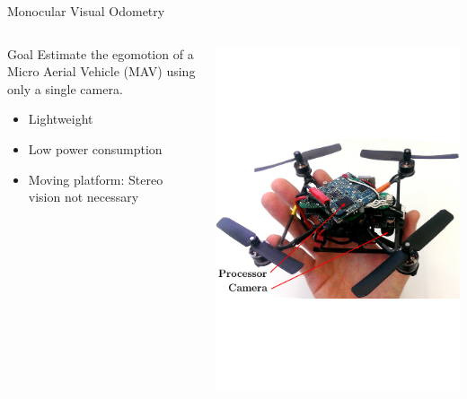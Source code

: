 \documentclass[10pt]{beamer}
\begin{document}
\begin{frame}{Monocular Visual Odometry}
	\begin{columns}
	  \begin{column}{0.4\textwidth}
	  	\begin{block}{Goal}
	  		\vspace{0.2cm}
	  		Estimate the egomotion of a Micro Aerial Vehicle (MAV) using only a single camera.
	  		\begin{itemize}
	  			\item Lightweight
	  			\item Low power consumption
	  			\item Moving platform: Stereo vision not necessary
	  		\end{itemize}
		\end{block}
	  \end{column}
	  \begin{column}{0.6\textwidth}
	    \includegraphics[width=\textwidth]{img/nano}
	  \end{column}
	\end{columns}
\end{frame}
\end{document}
